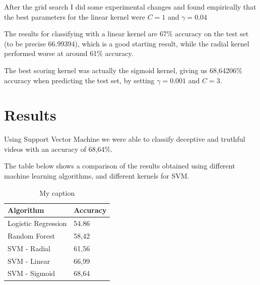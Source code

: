 After the grid search I did some experimental changes and found empirically that the best parameters for the linear kernel were $C = 1$ and $\gamma = 0.04$

The results for classifying with a linear kernel are 67\% accuracy on the test set (to be precise 66.99394), which is a good starting result, while the radial kernel performed worse at around 61\% accuracy.

The best scoring kernel was actually the sigmoid kernel, giving us 68,64206\% accuracy when predicting the test set, by setting $\gamma  = 0.001$ and $C = 3$.

\clearpage

\section{Results} \label{results}
Using Support Vector Machine we were able to classify deceptive and truthful videos with an accuracy of 68,64\%.

The table below shows a comparison of the results obtained using different machine learning algorithms, and different kernels for SVM.

\begin{table}[H]
	\centering
	\begin{tabular}{|l|l|}
		\hline
		\textbf{Algorithm}  & \textbf{Accuracy} \\ \hline
		Logistic Regression & 54.86             \\ \hline
		Random Forest       & 58,42             \\ \hline
		SVM - Radial        & 61,56             \\ \hline
		SVM - Linear        & 66,99             \\ \hline
		SVM - Sigmoid       & 68,64             \\ \hline
	\end{tabular}
	\caption{My caption}
\end{table}